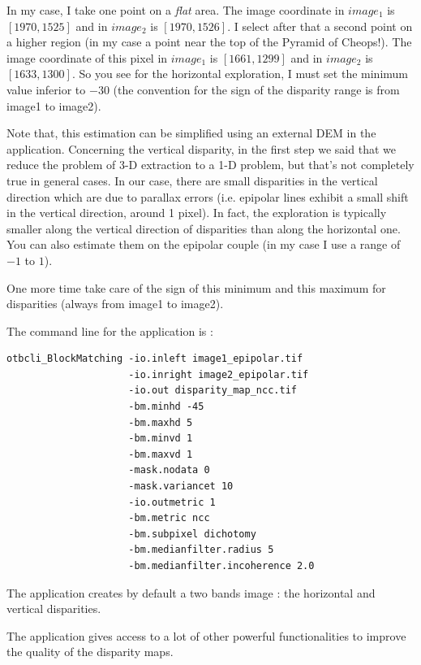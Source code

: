 In my case, I take one point on a \textit{flat} area. The image coordinate in $image_{1}$
is $[1970,1525]$ and in $image_{2}$ is $[1970,1526]$. I select after that a second
point on a higher region (in my case a point near the top of the Pyramid of
Cheops!). The image coordinate of this pixel in $image_{1}$ is $[1661,1299]$ and
in $image_{2}$ is $[1633,1300]$.  So you see for the horizontal exploration, I
must set the minimum value inferior to $-30$ (the convention for the sign of the
disparity range is from image1 to image2).

Note that, this estimation can be simplified using an external DEM in the
 application. Concerning the
vertical disparity, in the first step we said that we reduce the problem of 3-D
extraction to a 1-D problem, but that's not completely true in general cases. In our
case, there are small disparities in the vertical direction which are due to
parallax errors (i.e. epipolar lines exhibit a small shift in the vertical
direction, around 1 pixel). In fact, the exploration is typically smaller along 
the vertical direction of disparities than along the horizontal one. You can also estimate
them on the epipolar couple (in my case I use a range of $-1$ to $1$).

One more time take care of the sign of this minimum and this maximum for
disparities (always from image1 to image2).

The command line for the  application is :
\begin{verbatim}
otbcli_BlockMatching -io.inleft image1_epipolar.tif
                     -io.inright image2_epipolar.tif
                     -io.out disparity_map_ncc.tif
                     -bm.minhd -45
                     -bm.maxhd 5
                     -bm.minvd 1
                     -bm.maxvd 1
                     -mask.nodata 0
                     -mask.variancet 10
                     -io.outmetric 1
                     -bm.metric ncc
                     -bm.subpixel dichotomy
                     -bm.medianfilter.radius 5
                     -bm.medianfilter.incoherence 2.0
\end{verbatim}

The application creates by default a two bands image : the horizontal and
vertical disparities.

The  application gives access to a lot of other
powerful functionalities to improve the quality of the disparity maps.

